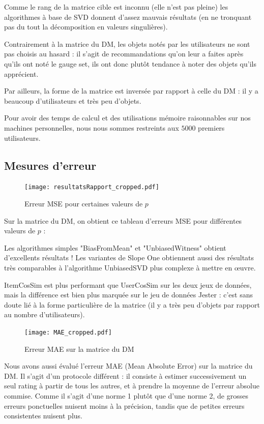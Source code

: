 \documentclass[11pt, openany, a4paper]{article}
\begin{document}
		Comme le rang de la matrice cible est inconnu (elle n'est pas pleine) les algorithmes à base de SVD donnent d'assez mauvais résultats (en ne tronquant pas du tout la décomposition en valeurs singulières).
		
		Contrairement à la matrice du DM, les objets notés par les utilisateurs ne sont pas choisis au hasard : il s'agit de recommandations qu'on leur a faites après qu'ils ont noté le gauge set, ils ont donc plutôt tendance à noter des objets qu'ils apprécient.
		
		Par ailleurs, la forme de la matrice est inversée par rapport à celle du DM : il y a beaucoup d'utilisateurs et très peu d'objets.
		
		Pour avoir des temps de calcul et des utilisations mémoire raisonnables sur nos machines personnelles, nous nous sommes restreints aux $5000$ premiers utilisateurs.
	
	\subsection{Mesures d'erreur}
	
		\begin{figure}[ht!]
			\centering
			\texttt{[image: resultatsRapport\_cropped.pdf]}
			\caption{Erreur MSE pour certaines valeurs de $p$}
		\end{figure}
		Sur la matrice du DM, on obtient ce tableau d'erreurs MSE pour différentes valeurs de $p$ :
		
		
		Les algorithmes simples "BiasFromMean" et "UnbiasedWitness" obtient d'excellents résultats ! Les variantes de Slope One obtiennent aussi des résultats très comparables à l'algorithme UnbiasedSVD plus complexe à mettre en œuvre.
		
		ItemCosSim est plus performant que UserCosSim sur les deux jeux de données, mais la différence est bien plus marquée sur le jeu de données Jester : c'est sans doute lié à la forme particulière de la matrice (il y a très peu d'objets par rapport au nombre d'utilisateurs).
		
		\begin{figure}[ht!]
			\centering
			\texttt{[image: MAE\_cropped.pdf]}
			\caption{Erreur MAE sur la matrice du DM}
		\end{figure}
		
		Nous avons aussi évalué l'erreur MAE (Mean Absolute Error) sur la matrice du DM. Il s'agit d'un protocole différent : il consiste à estimer successivement un seul rating à partir de tous les autres, et à prendre la moyenne de l'erreur absolue commise. Comme il s'agit d'une norme 1 plutôt que d'une norme 2, de grosses erreurs ponctuelles nuisent moins à la précision, tandis que de petites erreurs consistentes nuisent plus.
		
\end{document}
